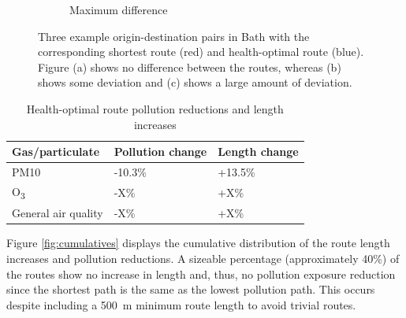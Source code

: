 \documentclass[11pt]{report}
\begin{document}
\begin{figure}[!tb]
\begin{minipage}{1\linewidth}
\begin{subfigure}[t]{.5\linewidth}
            \caption{Maximum difference}
            \label{fig:route_max}
        \end{subfigure}
    \end{minipage}
    \caption[Example routes.]{Three example origin-destination pairs in Bath with the corresponding shortest route (red) and health-optimal route (blue). Figure (a) shows no difference between the routes, whereas (b) shows some deviation and (c) shows a large amount of deviation.}
    \label{fig:origdestpairs}
\end{figure}

\begin{table}[!tbp]
  \centering
  \caption{Health-optimal route pollution reductions and length increases}
  \label{tab:pollution_reductions}
  \begin{tabular}{ l l l }
  \toprule
  Gas/particulate & Pollution change & Length change \\ \midrule
  PM10 & -10.3\% & +13.5\% \\
  O\textsubscript{3} & -X\% & +X\% \\
  General air quality & -X\% & +X\% \\ \bottomrule
  \end{tabular}
\end{table}

Figure \ref{fig:cumulatives} displays the cumulative distribution of the route length increases and pollution reductions. A sizeable percentage (approximately 40\%) of the routes show no increase in length and, thus, no pollution exposure reduction since the shortest path is the same as the lowest pollution path. This occurs despite including a 500~m minimum route length to avoid trivial routes.
\end{document}
